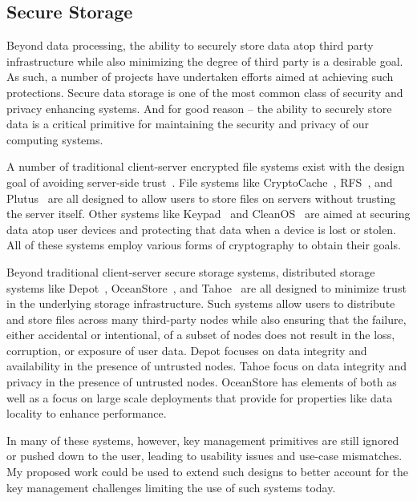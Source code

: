 \subsection{Secure Storage}

Beyond data processing, the ability to securely store data atop third
party infrastructure while also minimizing the degree of third party
is a desirable goal. As such, a number of projects have undertaken
efforts aimed at achieving such protections. Secure data storage is
one of the most common class of security and privacy enhancing
systems. And for good reason -- the ability to securely store data is
a critical primitive for maintaining the security and privacy of our
computing systems.

A number of traditional client-server encrypted file systems exist
with the design goal of avoiding server-side
trust~\cite{kher2005}. File systems like
CryptoCache~\cite{jensen2000}, RFS~\cite{dong2011}, and
Plutus~\cite{kallahalla2003} are all designed to allow users to store
files on servers without trusting the server itself. Other systems
like Keypad~\cite{geambasu2011} and CleanOS~\cite{tang2012} are aimed
at securing data atop user devices and protecting that data when a
device is lost or stolen. All of these systems employ various forms of
cryptography to obtain their goals.
 
Beyond traditional client-server secure storage systems, distributed
storage systems like Depot~\cite{mahajan2011},
OceanStore~\cite{kubiatowicz2000}, and Tahoe~\cite{wilcox-o'hearn2008}
are all designed to minimize trust in the underlying storage
infrastructure. Such systems allow users to distribute and store files
across many third-party nodes while also ensuring that the failure,
either accidental or intentional, of a subset of nodes does not result
in the loss, corruption, or exposure of user data. Depot focuses on
data integrity and availability in the presence of untrusted
nodes. Tahoe focus on data integrity and privacy in the presence of
untrusted nodes. OceanStore has elements of both as well as a focus on
large scale deployments that provide for properties like data locality
to enhance performance.

In many of these systems, however, key management primitives are still
ignored or pushed down to the user, leading to usability issues and
use-case mismatches. My proposed work could be used to extend such
designs to better account for the key management challenges limiting
the use of such systems today.

